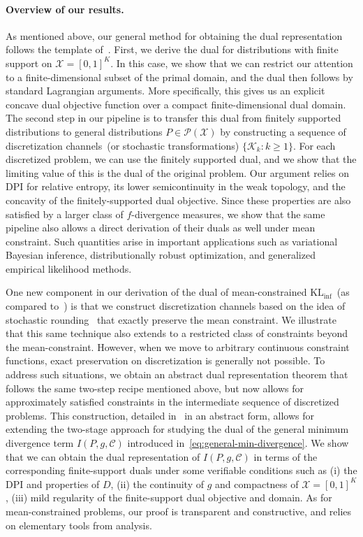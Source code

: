 \documentclass{article}
\theoremstyle{plain}
\theoremstyle{definition}
\newcommand{\KLinf}{\operatorname{KL_{inf}}}
\newcommand{\calP}{\mathcal P}
\newcommand{\calC}{\mathcal C}
\newcommand{\calX}{\mathcal X}
\newcommand{\calK}{\mathcal{K}}
\newcommand{\lsc}{\text{lsc}\xspace}
\begin{document}
\paragraph{Overview of our results.} As mentioned above, our general method for obtaining the dual representation follows the template of~\citet[\S~4.1]{honda2010asymptotically}. First, we derive the dual for distributions with finite support on $\calX = [0,1]^K$. In this case, we show that we can restrict our attention to a finite-dimensional subset of the primal domain, and the dual then follows by standard Lagrangian arguments. More specifically, this gives us an explicit concave dual objective function  over a compact finite-dimensional dual domain. The second step in our pipeline is to transfer this dual from finitely supported distributions to general distributions $P \in \calP(\calX)$ by constructing a sequence of discretization channels~(or stochastic transformations) $\{\calK_k:k \geq 1\}$. For each discretized problem, we can use the finitely supported dual, and we show that the limiting value of this is the dual of the original problem.  Our argument relies on DPI for relative entropy, its lower semicontinuity in the weak topology, and the concavity of the finitely-supported dual objective. Since these properties are also satisfied by a larger class of $f$-divergence measures, we show that the same pipeline also allows a direct derivation of their duals as well under mean constraint. Such quantities arise in important applications such as variational Bayesian inference, distributionally robust optimization, and generalized empirical likelihood methods. 

One new component in our derivation of the dual of mean-constrained $\KLinf$~(as compared to~\citet{honda2010asymptotically}) is that we construct discretization channels based on the idea of stochastic rounding~\citep{croci2022stochastic} that exactly preserve the mean constraint. We illustrate that this same technique also extends to a restricted class of constraints beyond the mean-constraint. However, when we move to arbitrary continuous constraint functions, exact preservation on discretization is  generally not possible. To address such situations, we obtain an abstract dual representation theorem that follows the same two-step recipe mentioned above, but now allows for approximately satisfied constraints in the intermediate sequence of discretized problems. This construction, detailed in~ in an abstract form, allows for extending the two-stage approach for studying the dual of the general minimum divergence term $I(P, g, \calC)$ introduced in~\eqref{eq:general-min-divergence}.
We show that we can obtain the dual representation of $I(P, g, \calC)$ in terms of the corresponding finite-support duals under some verifiable conditions such as (i) the DPI and \lsc properties of $D$, (ii) the continuity of $g$ and compactness of $\calX =[0,1]^K$, (iii) mild regularity of the finite-support dual objective and domain. As for mean-constrained problems, our proof is transparent and constructive, and relies on elementary tools from analysis. 
\end{document}
